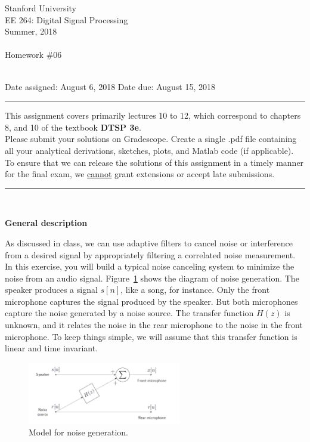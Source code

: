 \documentclass[12pt]{report}
\begin{document}
\thispagestyle{empty}
\begin{centering}
	{\large Stanford University}\\
	{\large EE 264: Digital Signal Processing}\\
	{\large Summer, 2018} \\
	\mbox{}\\
	{\large Homework \#06}\\
	\mbox{}\\
\end{centering}
\noindent Date assigned:  August 6, 2018 \hfill
Date due: August 15, 2018\\
\noindent \rule{6.5 in}{0.5pt}
  This assignment covers primarily lectures 10 to 12, which correspond to chapters 8, and 10 of the textbook {\bf DTSP 3e}. \\
  Please submit your solutions on Gradescope. Create a single .pdf file containing all your analytical derivations, sketches, plots, and Matlab code (if applicable). \\
  To ensure that we can release the solutions of this assignment in a timely manner for the final exam, we \underline{cannot} grant extensions or accept late submissions.

\noindent
\rule{6.5 in}{0.5pt}
\mbox{}\\


\noindent \textbf{General description}

As discussed in class, we can use adaptive filters to cancel noise or interference from a desired signal by appropriately filtering a correlated noise measurement. In this exercise, you will build a typical noise canceling system to minimize the noise from an audio signal. Figure~\ref{fig:noise-gen} shows the diagram of noise generation. The speaker produces a signal $s[n]$, like a song, for instance. Only the front microphone captures the signal produced by the speaker. But both microphones capture the noise generated by a noise source. The transfer function $H(z)$ is unknown, and it relates the noise in the rear microphone to the noise in the front microphone. To keep things simple, we will assume that this transfer function is linear and time invariant.

\begin{figure}[!h]
	\centering
	\includegraphics[width=0.6\textwidth]{figs/noise_generation.png}
	\caption{Model for noise generation.} \label{fig:noise-gen}
\end{figure}
\end{document}
